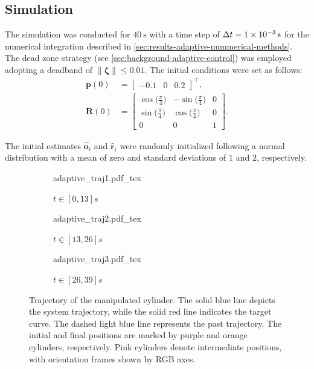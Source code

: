 \subsection{Simulation}
The simulation was conducted for $\qty{40}{\second}$ with a time step of $\Delta t=\qty{1E-3}{\second}$ for the numerical integration described in \cref{sec:results-adaptive-nummerical-methods}. The dead zone strategy (see \cref{sec:background-adaptive-control}) was employed adopting a deadband of $\|\boldsymbol{\zeta}\| \le 0.01$. The initial conditions were set as follows:
\begin{align}
    \mathbf{p}(0) &= \begin{bmatrix}
        -0.1 & 0 & 0.2
    \end{bmatrix}^\top,\\
    \mathbf{R}(0) &= \begin{bmatrix}
        \cos\bigl(\frac{\pi}{4}\bigr) & -\sin\bigl(\frac{\pi}{4}\bigr) & 0\\
        \sin\bigl(\frac{\pi}{4}\bigr) & \cos\bigl(\frac{\pi}{4}\bigr) & 0\\
        0 & 0 & 1
    \end{bmatrix}.
\end{align}

The initial estimates $\widehat{\mathbf{o}}_i$ and $\widehat{\mathbf{r}}_i$ were randomly initialized following a normal distribution with a mean of zero and standard deviations of $1$ and $2$, respectively. 
\begin{figure}[ht]
    \centering
    \begin{subfigure}[b]{0.32\textwidth}
        \centering
        \def\svgwidth{\linewidth}
        {{adaptive_traj1.pdf_tex}}
        \caption{$t\in[0, 13]s$}
        \label{fig:adaptive-traj-first}
    \end{subfigure}
    \hfill
    \begin{subfigure}[b]{0.32\textwidth}
        \centering
        \def\svgwidth{\linewidth}
        {{adaptive_traj2.pdf_tex}}
        \caption{$t\in[13, 26]s$}
        \label{fig:adaptive-traj-second}
    \end{subfigure}
    \hfill
    \begin{subfigure}[b]{0.32\textwidth}
        \centering
        \def\svgwidth{\linewidth}
        {{adaptive_traj3.pdf_tex}}
        \caption{$t\in[26, 39]s$}
        \label{fig:adaptive-traj-third}
    \end{subfigure}
    \caption{Trajectory of the manipulated cylinder. The solid blue line depicts the system trajectory, while the solid red line indicates the target curve. The dashed light blue line represents the past trajectory. The initial and final positions are marked by purple and orange cylinders, respectively. Pink cylinders denote intermediate positions, with orientation frames shown by RGB axes.}
    \label{fig:adaptive-trajectory}
\end{figure}


